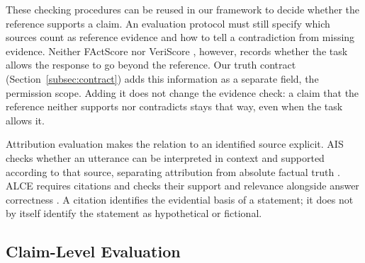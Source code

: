 \documentclass{clv2025}
\begin{document}
These checking procedures can be reused in our framework to decide whether
the reference supports a claim. An evaluation protocol must still specify
which sources count as reference evidence and how to tell a contradiction
from missing evidence. Neither FActScore nor VeriScore \citep{min_factscore_2023,song_veriscore_2024}, however, records
whether the task allows the response to go beyond the reference. Our truth
contract (Section~\ref{subsec:contract}) adds this information as a
separate field, the permission scope. Adding it does not change the
evidence check: a claim that the reference neither supports nor
contradicts stays that way, even when the task allows it.

Attribution evaluation makes the relation to an identified source explicit.
AIS checks whether an utterance can be interpreted in context and supported
according to that source, separating attribution from absolute factual truth
\citep{rashkin_ais_2023}. ALCE requires citations and checks their support
and relevance alongside answer correctness \citep{gao_alce_2023}.
A citation identifies the evidential basis of a statement; it does not by
itself identify the statement as hypothetical or fictional.

\subsection{Claim-Level Evaluation}\label{subsec:extraction}
\end{document}
